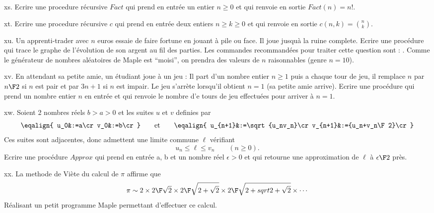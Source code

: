 \exo [Level=1,Fight=0,Learn=0,Field=\Programmation,Type=\Maple,Origin=,Solution=] xs. 
Ecrire une procedure récursive $Fact$ qui prend en entrée un entier $n\ge0$ et qui renvoie en sortie $Fact(n)=n!$. 

\exo [Level=1,Fight=0,Learn=0,Field=\Programmation,Type=\Maple,Origin=,Solution=,Indication={Indication : pour la définition récursive, on utilisera que 
$$
\ds {n-1\choose k-1}+{n-1\choose k}={n\choose k}\qquad(1\le k\le n).
$$ }] xt. 
Ecrire une procedure récursive $c$ qui prend en entrée deux entiers $n\ge k\ge0$ et qui renvoie en sortie $c(n,k)={n\choose k}$. 

\exo [Level=1,Fight=0,Learn=0,Field=\Programmation,Type=\Maple,Origin=,Solution=] xu. 
Un apprenti-trader avec $n$ euros essaie de faire fortune en jouant à pile ou face. Il joue jusquà la ruine complete. \medskip\noindent
Ecrire une procédure qui trace le graphe de l'évolution de son argent au fil des parties. \pn
Les commandes recommandées  pour traiter cette question sont : . \pn
Comme le générateur de nombres aléatoires de Maple est ``moisi'', on prendra des valeurs de $n$ raisonnables (genre $n=10$). 

\exo [Level=1,Fight=0,Learn=0,Field=\Programmation,Type=\Maple,Origin=,Solution=] xv. 
En attendant sa petite amie, un étudiant joue à un jeu : \pn 
Il part d'un nombre entier $n\ge1$ puis a chaque tour de jeu, il remplace $n$ par ${n\F 2}$ si $n$ est pair et par $3n+1$ si $n$ est impair. 
Le jeu s'arrète lorsqu'il obtient $n=1$ (sa petite amie arrive). \pn
Ecrire une procédure qui prend un nombre entier $n$ en entrée et qui renvoie le nombre d'e tours de jeu effectuées pour arriver à $n=1$. 

\exo [Level=1,Fight=0,Learn=0,Field=\Programmation,Type=\Maple,Origin=,Solution=] xw. 
Soient 2 nombres réels $b>a>0$ et les suites $u$ et $v$ definies par 
$$
\eqalign{
	u_0&:=a\cr 
	v_0&:=b\cr
}\qquad\mbox{et}\qquad
\eqalign{
	u_{n+1}&:=\sqrt{u_nv_n}\cr
	v_{n+1}&:={u_n+v_n\F2}\cr 
}
$$
Ces suites sont adjacentes, donc admettent une limite commune $\ell$ vérifiant  
$$
u_n\le \ell\le v_n\qquad(n\ge0).
$$
Ecrire une procédure $Approx$ qui prend en entrée a, b et un nombre réel $\epsilon>0$ et qui retourne une approximation de $\ell$ à ${\epsilon\F 2}$ près. 

\exo [Level=1,Fight=0,Learn=0,Field=\Programmation,Type=\Maple,Origin=,Solution=,Indication={ On pourra utiliser une procédure récursive.}] xx. 
La methode de Viète du calcul de $\pi$ affirme que 
$$
\pi\sim 2\times{2\F\sqrt2}\times{2\F\sqrt{2+\sqrt 2}}\times{2\F\sqrt{2+sqrt{2+\sqrt 2}}}\times\cdots
$$
Réalisant un petit programme Maple permettant d'effectuer ce calcul.

